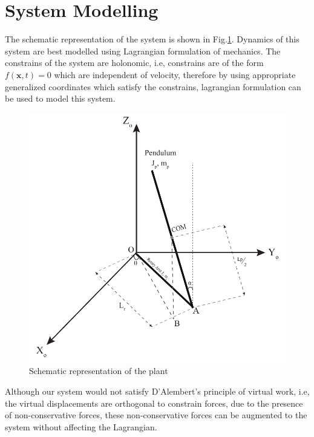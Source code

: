 \documentclass[superscriptaddress,floatfix,reprint,amssymb, amsmath,aps, pre]{revtex4-1}
\newcommand{\bx}{\textbf{x}}
\begin{document}
{    \section{System Modelling}
    {
        The schematic representation of the system is shown in Fig.\ref{fig:modelFigure}. Dynamics of this system are best modelled using Lagrangian formulation of mechanics. The constrains of the system are holonomic, i.e, constrains are of the form \(f(\bx,t) = 0\) which are independent of velocity, therefore by using appropriate generalized coordinates which satisfy the constrains, lagrangian formulation can be used to model this system. 
        \begin{figure}[h!]
            \includegraphics[width = \linewidth]{modelFigure.pdf}
            \caption{Schematic representation of the plant}
            \label{fig:modelFigure}
        \end{figure}
        Although our system would not satisfy D'Alembert's principle of virtual work, i.e, the virtual displacements are orthogonal to constrain forces, due to the presence of non-conservative forces, these non-conservative forces can be augmented to the system without affecting the Lagrangian.

}}
\end{document}
